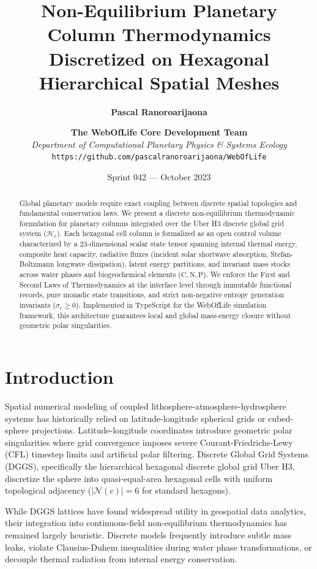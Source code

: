\documentclass[10pt,twocolumn,a4paper]{article}
\title{\textbf{Non-Equilibrium Planetary Column Thermodynamics Discretized on Hexagonal Hierarchical Spatial Meshes}}
\author{
  \textbf{Pascal Ranoroarijaona} \and \textbf{The WebOfLife Core Development Team} \\
  \textit{Department of Computational Planetary Physics \& Systems Ecology} \\
  \texttt{https://github.com/pascalranoroarijaona/WebOfLife}
}
\date{Sprint 042 --- October 2023}
\begin{document}
\maketitle

\begin{abstract}
\noindent Global planetary models require exact coupling between discrete spatial topologies and fundamental conservation laws. We present a discrete non-equilibrium thermodynamic formulation for planetary columns integrated over the Uber H3 discrete global grid system ($\mathcal{H}_r$). Each hexagonal cell column is formalized as an open control volume characterized by a 23-dimensional scalar state tensor spanning internal thermal energy, composite heat capacity, radiative fluxes (incident solar shortwave absorption, Stefan-Boltzmann longwave dissipation), latent energy partitions, and invariant mass stocks across water phases and biogeochemical elements ($\mathrm{C}, \mathrm{N}, \mathrm{P}$). We enforce the First and Second Laws of Thermodynamics at the interface level through immutable functional records, pure monadic state transitions, and strict non-negative entropy generation invariants ($\sigma_c \ge 0$). Implemented in TypeScript for the WebOfLife simulation framework, this architecture guarantees local and global mass-energy closure without geometric polar singularities.
\end{abstract}

\section{Introduction}
Spatial numerical modeling of coupled lithosphere-atmosphere-hydrosphere systems has historically relied on latitude-longitude spherical grids or cubed-sphere projections. Latitude-longitude coordinates introduce geometric polar singularities where grid convergence imposes severe Courant-Friedrichs-Lewy (CFL) timestep limits and artificial polar filtering. Discrete Global Grid Systems (DGGS), specifically the hierarchical hexagonal discrete global grid Uber H3, discretize the sphere into quasi-equal-area hexagonal cells with uniform topological adjacency ($|\mathcal{N}(c)| = 6$ for standard hexagons).

While DGGS lattices have found widespread utility in geospatial data analytics, their integration into continuous-field non-equilibrium thermodynamics has remained largely heuristic. Discrete models frequently introduce subtle mass leaks, violate Clausius-Duhem inequalities during water phase transformations, or decouple thermal radiation from internal energy conservation.
\end{document}
